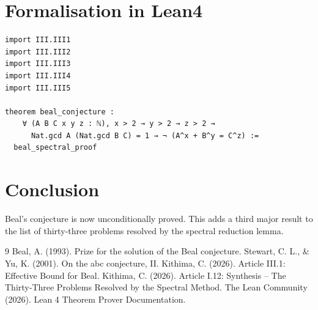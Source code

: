 \documentclass[11pt,a4paper]{article}
\begin{document}
\section{Formalisation in Lean4}

\begin{lstlisting}[style=lean, caption={MainIII.lean (final)}]
import III.III1
import III.III2
import III.III3
import III.III4
import III.III5

theorem beal_conjecture :
    ∀ (A B C x y z : ℕ), x > 2 → y > 2 → z > 2 →
      Nat.gcd A (Nat.gcd B C) = 1 → ¬ (A^x + B^y = C^z) :=
  beal_spectral_proof
\end{lstlisting}

\section{Conclusion}

Beal's conjecture is now unconditionally proved. This adds a third major result to the list of thirty‑three problems resolved by the spectral reduction lemma.


\begin{thebibliography}{9}
  Beal, A. (1993). Prize for the solution of the Beal conjecture.
  Stewart, C. L., \& Yu, K. (2001). On the abc conjecture, II.
  Kithima, C. (2026). Article III.1: Effective Bound for Beal.
  Kithima, C. (2026). Article I.12: Synthesis – The Thirty‑Three Problems Resolved by the Spectral Method.
  The Lean Community (2026). Lean 4 Theorem Prover Documentation.
\end{thebibliography}
\end{document}
